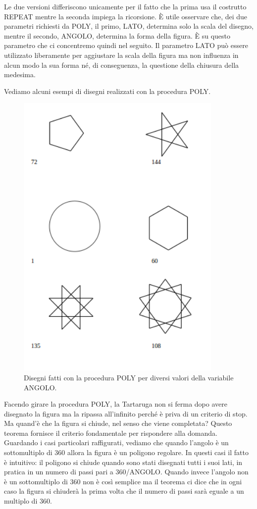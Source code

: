 \vskip 1cm

Le due versioni differiscono unicamente per il fatto che la prima usa il costrutto
REPEAT mentre la seconda impiega la ricorsione. È utile osservare che, dei due parametri richiesti da POLY, il primo, LATO, determina solo la scala del disegno, mentre il secondo, ANGOLO, determina la forma della figura. È su questo parametro che ci concentremo quindi nel seguito. Il parametro LATO può essere utilizzato liberamente per aggiustare la scala della figura ma non influenza in alcun modo la sua forma né, di conseguenza, la questione della chiusura della medesima.

Vediamo alcuni esempi di disegni realizzati con la procedura POLY.

\begin{figure}[H]
   \centering
   \includegraphics[width=10.0cm]{./images/marta/poly1.png}
   \caption{Disegni fatti con la procedura POLY per diversi valori della variabile ANGOLO.}
   \label{poly}
\end{figure}

Facendo girare la procedura POLY, la Tartaruga non si ferma dopo avere disegnato la figura ma la ripassa all'infinito perché è priva di un criterio di stop. Ma quand'è che la figura si chiude, nel senso che viene completata? Questo teorema fornisce il criterio fondamentale per rispondere alla domanda. Guardando i casi particolari raffigurati, vediamo che quando l'angolo è un sottomultiplo di 360 allora la figura è un poligono regolare. In questi casi il fatto è intuitivo: il poligono si chiude quando sono stati disegnati tutti i suoi lati, in pratica in un numero di passi pari a 360/ANGOLO. Quando invece l'angolo non è un sottomultiplo di 360 non è così semplice ma il teorema ci dice che in ogni caso la figura si chiuderà la prima volta che il numero di passi sarà eguale a un multiplo di 360. 

